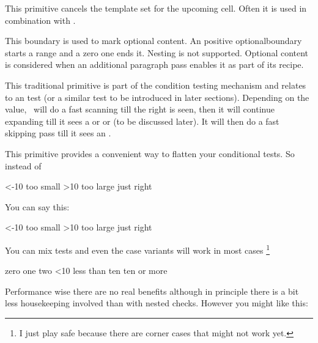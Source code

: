 \stopnewprimitive

\startoldprimitive[title={\prm {omit}}]

This primitive cancels the template set for the upcoming cell. Often it is used
in combination with .

\stopoldprimitive

\startnewprimitive[title={\prm {optionalboundary}}]

This boundary is used to mark optional content. An positive \prm
{optionalboundary} starts a range and a zero one ends it. Nesting is not
supported. Optional content is considered when an additional paragraph pass
enables it as part of its recipe.

\stopnewprimitive

\startoldprimitive[title={\prm {or}}]

This traditional primitive is part of the condition testing mechanism and relates
to an  test (or a similar test to be introduced in later
sections). Depending on the value, \TEX\ will do a fast scanning till the right
 is seen, then it will continue expanding till it sees a 
or  or  (to be discussed later). It will then do a
fast skipping pass till it sees an .

\stopoldprimitive

\startnewprimitive[title={\prm {orelse}}]

This primitive provides a convenient way to flatten your conditional tests. So
instead of

\starttyping
\ifnum\scratchcounter<-10
    too small
\else\ifnum\scratchcounter>10
    too large
\else
    just right
\fi\fi
\stoptyping

You can say this:

\starttyping
\ifnum\scratchcounter<-10
    too small
\orelse\ifnum\scratchcounter>10
    too large
\else
    just right
\fi
\stoptyping

You can mix tests and even the case variants will work in most cases \footnote {I
just play safe because there are corner cases that might not work yet.}

\starttyping
\ifcase\scratchcounter          zero
\or                             one
\or                             two
\orelse\ifnum\scratchcounter<10 less than ten
\else                           ten or more
\fi
\stoptyping

Performance wise there are no real benefits although in principle there is a bit
less housekeeping involved than with nested checks. However you might like this:

